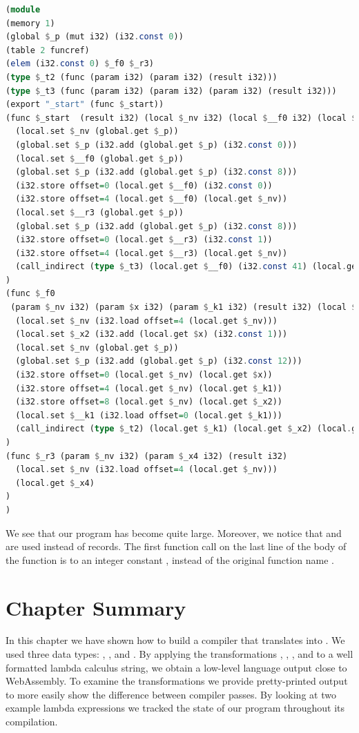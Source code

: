 {\begin{lstlisting}[language=Haskell]
(module
(memory 1)
(global $_p (mut i32) (i32.const 0))
(table 2 funcref)
(elem (i32.const 0) $_f0 $_r3)
(type $_t2 (func (param i32) (param i32) (result i32)))
(type $_t3 (func (param i32) (param i32) (param i32) (result i32)))
(export "_start" (func $_start))
(func $_start  (result i32) (local $_nv i32) (local $__f0 i32) (local $__r3 i32)
  (local.set $_nv (global.get $_p))
  (global.set $_p (i32.add (global.get $_p) (i32.const 0)))
  (local.set $__f0 (global.get $_p))
  (global.set $_p (i32.add (global.get $_p) (i32.const 8)))
  (i32.store offset=0 (local.get $__f0) (i32.const 0))
  (i32.store offset=4 (local.get $__f0) (local.get $_nv))
  (local.set $__r3 (global.get $_p))
  (global.set $_p (i32.add (global.get $_p) (i32.const 8)))
  (i32.store offset=0 (local.get $__r3) (i32.const 1))
  (i32.store offset=4 (local.get $__r3) (local.get $_nv))
  (call_indirect (type $_t3) (local.get $__f0) (i32.const 41) (local.get $__r3) (i32.const 0))
)
(func $_f0
 (param $_nv i32) (param $x i32) (param $_k1 i32) (result i32) (local $_x2 i32) (local $__k1 i32)
  (local.set $_nv (i32.load offset=4 (local.get $_nv)))
  (local.set $_x2 (i32.add (local.get $x) (i32.const 1)))
  (local.set $_nv (global.get $_p))
  (global.set $_p (i32.add (global.get $_p) (i32.const 12)))
  (i32.store offset=0 (local.get $_nv) (local.get $x))
  (i32.store offset=4 (local.get $_nv) (local.get $_k1))
  (i32.store offset=8 (local.get $_nv) (local.get $_x2))
  (local.set $__k1 (i32.load offset=0 (local.get $_k1)))
  (call_indirect (type $_t2) (local.get $_k1) (local.get $_x2) (local.get $__k1))
)
(func $_r3 (param $_nv i32) (param $_x4 i32) (result i32) 
  (local.set $_nv (i32.load offset=4 (local.get $_nv)))
  (local.get $_x4)
)
)
\end{lstlisting}

We see that our program has become quite large. Moreover, we notice that  and  are used instead of records. The first function call on the last line of the body of the  function is to an integer constant , instead of the original function name .

\section{\label{section:summarycps}Chapter Summary}
In this chapter we have shown how to build a compiler that translates  into . We used three data types: , , and . By applying the transformations , , , and  to a well formatted lambda calculus string, we obtain a low-level language output close to WebAssembly. To examine the transformations we provide pretty-printed output to more easily show the difference between compiler passes. By looking at two example lambda expressions we tracked the state of our program throughout its compilation.

}
